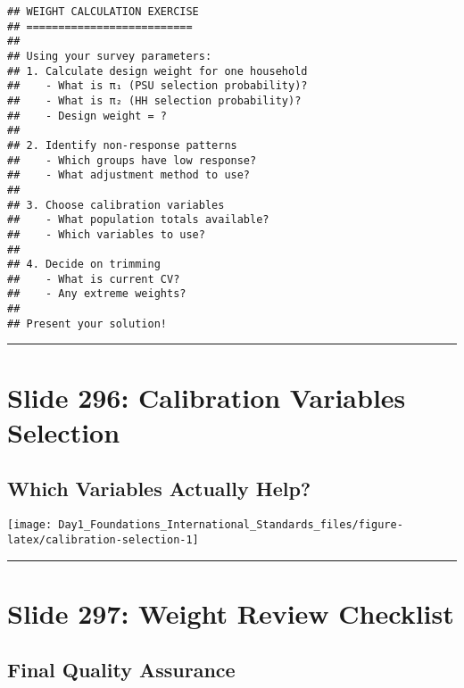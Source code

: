 \documentclass[
]{article}
\begin{document}
\begin{verbatim}
## WEIGHT CALCULATION EXERCISE
## ==========================
## 
## Using your survey parameters:
## 1. Calculate design weight for one household
##    - What is π₁ (PSU selection probability)?
##    - What is π₂ (HH selection probability)?
##    - Design weight = ?
## 
## 2. Identify non-response patterns
##    - Which groups have low response?
##    - What adjustment method to use?
## 
## 3. Choose calibration variables
##    - What population totals available?
##    - Which variables to use?
## 
## 4. Decide on trimming
##    - What is current CV?
##    - Any extreme weights?
## 
## Present your solution!
\end{verbatim}

\begin{center}\rule{0.5\linewidth}{0.5pt}\end{center}

\section{Slide 296: Calibration Variables
Selection}\label{slide-296-calibration-variables-selection}

\subsection{Which Variables Actually
Help?}\label{which-variables-actually-help-1}

\texttt{[image: Day1\_Foundations\_International\_Standards\_files/figure-latex/calibration-selection-1]}

\begin{center}\rule{0.5\linewidth}{0.5pt}\end{center}

\section{Slide 297: Weight Review
Checklist}\label{slide-297-weight-review-checklist}

\subsection{Final Quality Assurance}\label{final-quality-assurance}
\end{document}
